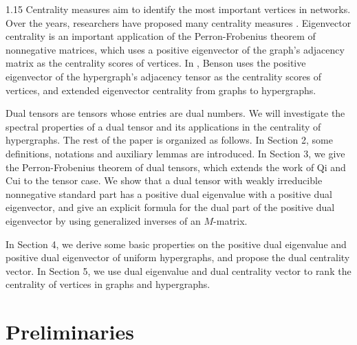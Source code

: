 \documentclass[preprint,12pt]{elsarticle}
\newtheorem{thm}{Theorem}[section]
\begin{document}
\begin{spacing}{1.15}
Centrality measures aim to identify the most important vertices in networks.
Over the years, researchers have proposed many centrality measures \cite{albert2000error,freeman1991centrality,alahakoon2011k,estrada2005subgraph,zhou2023estrada,lee2021betweenness,tudisco2018node}. Eigenvector centrality \cite{bonacich1972factoring} is an important application of the Perron-Frobenius theorem of nonnegative matrices, which uses a positive eigenvector of the graph's adjacency matrix as the centrality scores of vertices. In \cite{benson2019three}, Benson uses the positive eigenvector of the hypergraph's adjacency tensor as the centrality scores of vertices, and extended eigenvector centrality from graphs to hypergraphs.

Dual tensors are tensors whose entries are dual numbers. We will investigate the spectral properties of a dual tensor and its applications in the centrality of hypergraphs. The rest of the paper is organized as follows. In Section 2, some definitions, notations and auxiliary lemmas are introduced. In Section 3, we give the Perron-Frobenius theorem of dual tensors, which extends the work of Qi and Cui \cite{qi2024dual} to the tensor case. We show that a dual tensor with weakly irreducible nonnegative standard part has a positive dual eigenvalue with a positive dual eigenvector, and give an explicit formula for the dual part of the positive dual eigenvector by using generalized inverses of an $M$-matrix.

In Section 4, we derive some basic properties on the positive dual eigenvalue and positive dual eigenvector of uniform hypergraphs, and propose the dual centrality vector. In Section 5, we use dual eigenvalue and dual centrality vector to rank the centrality of vertices in graphs and hypergraphs.


\section{Preliminaries}


\end{spacing}
\end{document}
